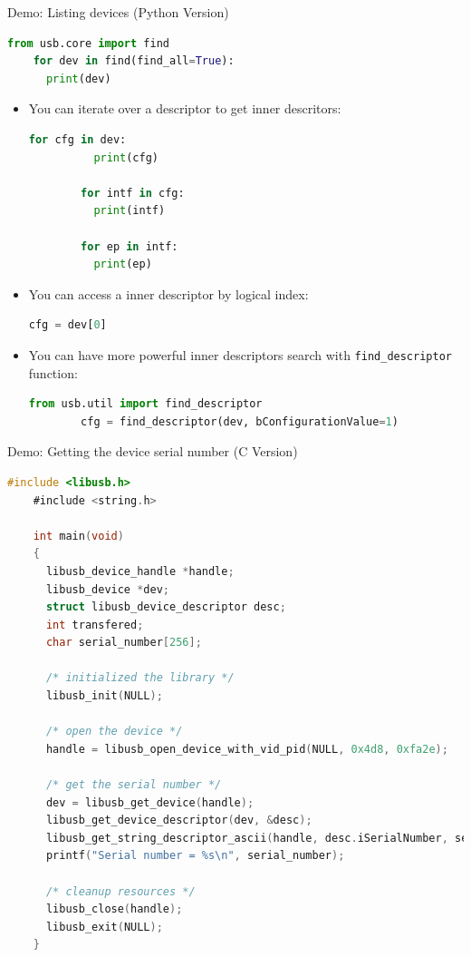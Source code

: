 \documentclass[pdf]{beamer}
\begin{document}
\begin{frame}[fragile]{Demo:  Listing devices (Python Version)}
  \tiny
  \pause
  \begin{lstlisting}[language=Python]
    from usb.core import find
    for dev in find(find_all=True):
      print(dev)
  \end{lstlisting}

  \begin{itemize}
    \tiny
    \pause
    \item You can iterate over a descriptor to get inner descritors:
      \begin{lstlisting}[language=Python]
        for cfg in dev:
          print(cfg)

        for intf in cfg:
          print(intf)

        for ep in intf:
          print(ep)
      \end{lstlisting}
    \pause
    \item You can access a inner descriptor by logical index:
      \begin{lstlisting}[language=Python]
        cfg = dev[0]
      \end{lstlisting}
    \pause
    \item You can have more powerful inner descriptors search with
      \texttt{find\_descriptor} function:
      \begin{lstlisting}[language=Python]
        from usb.util import find_descriptor
        cfg = find_descriptor(dev, bConfigurationValue=1)
      \end{lstlisting}
  \end{itemize}
\end{frame}

\begin{frame}[fragile]{Demo: Getting the device serial number (C Version)}
  \tiny
  \pause
  \begin{lstlisting}[language=C]
    #include <libusb.h>
    #include <string.h>

    int main(void)
    {
      libusb_device_handle *handle;
      libusb_device *dev;
      struct libusb_device_descriptor desc;
      int transfered;
      char serial_number[256];

      /* initialized the library */
      libusb_init(NULL);

      /* open the device */
      handle = libusb_open_device_with_vid_pid(NULL, 0x4d8, 0xfa2e);

      /* get the serial number */
      dev = libusb_get_device(handle);
      libusb_get_device_descriptor(dev, &desc);
      libusb_get_string_descriptor_ascii(handle, desc.iSerialNumber, serial_number, 256);
      printf("Serial number = %s\n", serial_number);

      /* cleanup resources */
      libusb_close(handle);
      libusb_exit(NULL);
    }
  \end{lstlisting}
\end{frame}
\end{document}

